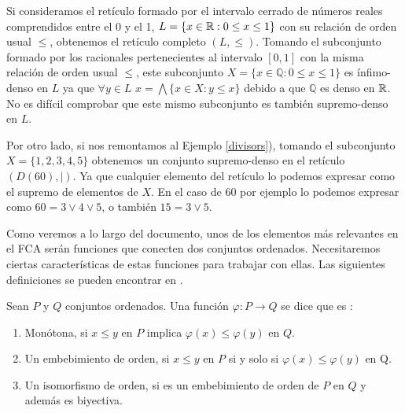 \documentclass[oneside,openright,titlepage,numbers=noenddot,openany,headinclude,footinclude=true,
cleardoublepage=empty,abstractoff,BCOR=5mm,paper=a4,fontsize=12pt,main=spanish]{scrreprt}
\begin{document}
\begin{exampleth}

Si consideramos el retículo formado por el intervalo cerrado de números reales comprendidos entre el 0 y el 1, $L=\{x \in \mathbb{R} : 0 \leq x \leq 1\}$ con su relación de orden usual $\leq$, obtenemos el retículo completo $(L,\leq)$. Tomando el subconjunto formado por los racionales pertenecientes al intervalo $[0,1]$ con la misma relación de orden usual $\leq$, este subconjunto $X=\{x \in \mathbb{Q}: 0\leq x \leq 1\}$ es ínfimo-denso en $L$ ya que $\forall y \in L$ $x=\bigwedge \{ x \in X : y\leq x\} $ debido a que $\mathbb{Q}$ es denso en $\mathbb{R}$. No es difícil comprobar que este mismo subconjunto es también supremo-denso en $L$.

Por otro lado, si nos remontamos al Ejemplo \ref{divisors}), tomando el subconjunto $X=\{1,2,3,4,5\}$ obtenemos un conjunto supremo-denso en el retículo $(D(60),|)$. Ya que cualquier elemento del retículo lo podemos expresar como el supremo de elementos de $X$.  En el caso de 60 por ejemplo lo podemos expresar como $60=3\vee4\vee5$, o también $15=3\vee 5$. 

\end{exampleth}

Como veremos a lo largo del documento, unos de los elementos más relevantes en el FCA serán funciones que conecten dos conjuntos ordenados. Necesitaremos ciertas características de estas funciones para trabajar con ellas. Las siguientes definiciones se pueden encontrar en \cite{introduction_lattices}.

\begin{definition}

Sean $P$ y $Q$ conjuntos ordenados. Una función $\varphi : P \rightarrow Q$ se dice que es :

\begin{enumerate}
    \item Monótona, si $x \leq y $ en $P$ implica $\varphi(x) \leq \varphi(y)$ en $Q$.
    
    \item Un embebimiento de orden, si $x \leq y$ en $P$ si y solo si $\varphi(x) \leq \varphi(y)$ en Q.
    
    \item Un isomorfismo de orden, si es un embebimiento de orden de $P$ en $Q$ y además es biyectiva.
\end{enumerate}
\end{definition}
\end{document}
